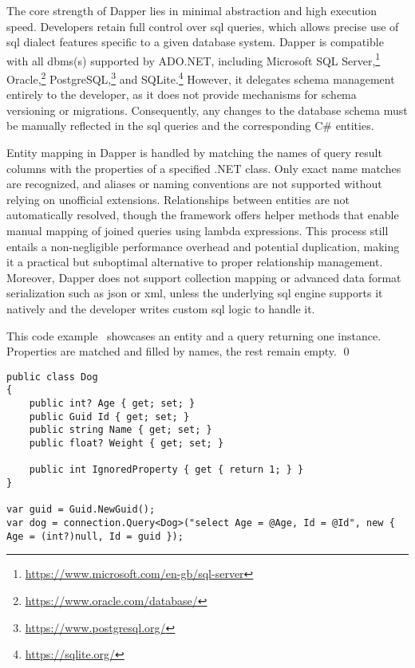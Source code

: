 The core strength of Dapper lies in minimal abstraction and high execution speed. Developers retain full control over \acrshort{sql} queries, which allows precise use of \acrshort{sql} dialect features specific to a given database system. Dapper is compatible with all \acrshort{dbms}(s) supported by ADO.NET, including Microsoft SQL Server,\footnote{\url{https://www.microsoft.com/en-gb/sql-server}} Oracle,\footnote{\url{https://www.oracle.com/database/}}  PostgreSQL,\footnote{\url{https://www.postgresql.org/}} and SQLite.\footnote{\url{https://sqlite.org/}} However, it delegates schema management entirely to the developer, as it does not provide mechanisms for schema versioning or migrations. Consequently, any changes to the database schema must be manually reflected in the \acrshort{sql} queries and the corresponding C\# entities.

Entity mapping in Dapper is handled by matching the names of query result columns with the properties of a specified .NET class. Only exact name matches are recognized, and aliases or naming conventions are not supported without relying on unofficial extensions. Relationships between entities are not automatically resolved, though the framework offers helper methods that enable manual mapping of joined queries using lambda expressions. This process still entails a non-negligible performance overhead and potential duplication, making it a practical but suboptimal alternative to proper relationship management. Moreover, Dapper does not support collection mapping or advanced data format serialization such as \acrshort{json} or \acrshort{xml}, unless the underlying \acrshort{sql} engine supports it natively and the developer writes custom \acrshort{sql} logic to handle it.

\begin{example}
\small
This code example~\cite{DapperRepo} showcases an entity and a query returning one instance. Properties are matched and filled by names, the rest remain empty.
\qed

\begin{lstlisting}[language=CSharp]
public class Dog
{
    public int? Age { get; set; }
    public Guid Id { get; set; }
    public string Name { get; set; }
    public float? Weight { get; set; }

    public int IgnoredProperty { get { return 1; } }
}

var guid = Guid.NewGuid();
var dog = connection.Query<Dog>("select Age = @Age, Id = @Id", new { Age = (int?)null, Id = guid });
\end{lstlisting}
\end{example}

